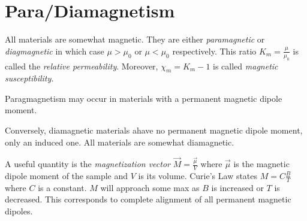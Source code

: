 \section{Para/Diamagnetism}

\begin{definition}
    All materials are somewhat magnetic. They are either \emph{paramagnetic} or \emph{diagmagnetic} in which case $\mu > \mu_0$ or $\mu < \mu_0$ respectively. This ratio $K_m = \frac{\mu}{\mu_0}$ is called the \emph{relative permeability}. Moreover, $\chi_m = K_m-1$ is called \emph{magnetic susceptibility.}
\end{definition}
\begin{remark}
    Paragmagnetism may occur in materials with a permanent magnetic dipole moment. 

    Conversely, diamagnetic materials ahave no permanent magnetic dipole moment, only an induced one. All materials are somewhat diamagnetic.
\end{remark}
\begin{definition}
    A useful quantity is the \emph{magnetization vector} $\vec{M} = \frac{\vec{\mu}}{V}$ where $\vec{\mu}$ is the magnetic dipole moment of the sample and $V$ is its volume. Curie's Law states $M = C\frac{B}{T}$ where $C$ is a constant. $M$ will approach some max as $B$ is increased or $T$ is decreased. This corresponds to complete alignment of all permanent magnetic dipoles.    
\end{definition}
